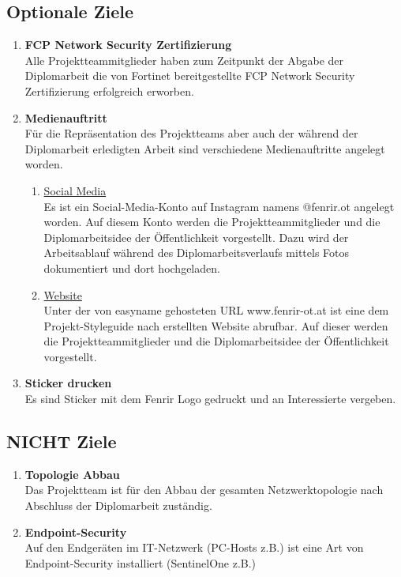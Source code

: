 \documentclass[
	headings=optiontotocandhead,%
	oneside,
	numbers=noenddot,%
	toc=flat, %
	10pt, %
	parskip=full, %
	listof=totoc, %
	listof=flat, %
	numbers=noenddot, %
	bibliography=totoc, %
	a4paper,DIV=14,
]{scrartcl}
\begin{document}
\subsection{Optionale Ziele}
\begin{enumerate}[start=1,label={\bfseries Ziel-O \arabic*},leftmargin=*,wide]
\item{\bfseries{FCP Network Security Zertifizierung}}\\
Alle Projektteammitglieder haben zum Zeitpunkt der Abgabe der Diplomarbeit die von Fortinet bereitgestellte FCP Network Security Zertifizierung erfolgreich erworben.

\item{\bfseries{Medienauftritt}}\\
Für die Repräsentation des Projektteams aber auch der während der Diplomarbeit erledigten Arbeit sind verschiedene Medienauftritte angelegt worden.

\begin{enumerate}[label=\alph*.]
\item{\underline{Social Media}}\\
Es ist ein Social-Media-Konto auf Instagram namens @fenrir.ot angelegt worden. Auf diesem Konto werden die Projektteammitglieder und die Diplomarbeitsidee der Öffentlichkeit vorgestellt. Dazu wird der Arbeitsablauf während des Diplomarbeitsverlaufs mittels Fotos dokumentiert und dort hochgeladen.

\item{\underline{Website}}\\
Unter der von easyname gehosteten URL www.fenrir-ot.at ist eine dem Projekt-Styleguide nach erstellten Website abrufbar. Auf dieser werden die Projektteammitglieder und die Diplomarbeitsidee der Öffentlichkeit vorgestellt.
\end{enumerate}

\item{\bfseries{Sticker drucken}}\\
Es sind Sticker mit dem Fenrir Logo gedruckt und an Interessierte vergeben.
\end{enumerate}

\subsection{NICHT Ziele}
\begin{enumerate}[start=1,label={\bfseries Ziel-N \arabic*},leftmargin=*,wide]
\item{\bfseries{Topologie Abbau}}\\
Das Projektteam ist für den Abbau der gesamten Netzwerktopologie nach Abschluss der Diplomarbeit zuständig.
\item{\bfseries{Endpoint-Security}}\\
Auf den Endgeräten im IT-Netzwerk (PC-Hosts z.B.) ist eine Art von Endpoint-Security installiert (SentinelOne z.B.)
\end{enumerate}
\newpage
\end{document}
